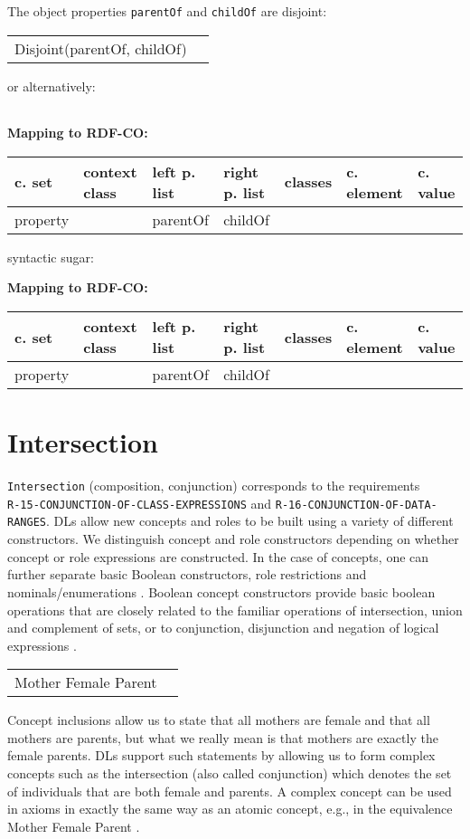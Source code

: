 \documentclass{llncs}
\newcommand{\ms}[1]{\texttt{#1}}
\newenvironment{gcotable}{
  \scriptsize
  \sffamily
  \vspace{0cm}
	\begin{center}
	\textbf{\vspace{0.4cm}Mapping to RDF-CO:} \\
  \begin{tabular}{l|l|l|l|l|l|l}
	\hline
  \textbf{c. set} & \textbf{context class} & \textbf{left p. list} & \textbf{right p. list} & \textbf{classes} & \textbf{c. element} & \textbf{c. value} \\
  \hline

}{
  \hline
  \end{tabular}
	\end{center}
}
\newenvironment{DL}{
\vspace{0cm}
	\begin{center}
  \begin{tabular}{r l}

}{
  \end{tabular}
	\end{center}
}
\begin{document}
The object properties \ms{parentOf} and \ms{childOf} are disjoint:

\begin{DL}
Disjoint(parentOf, childOf)\\
\end{DL}

or alternatively:

\begin{DL}

\end{DL}

\begin{gcotable}
property &  & parentOf & childOf &  &  \\
\end{gcotable}

syntactic sugar:

\begin{gcotable}
property &  & parentOf & childOf &  &  \\
\end{gcotable}

\section{Intersection}

\ms{Intersection} (composition, conjunction) corresponds to the requirements \\
\ms{R-15-CONJUNCTION-OF-CLASS-EXPRESSIONS} and \ms{R-16-CONJUNCTION-OF-DATA-} \ms{RANGES}.
DLs allow new concepts and roles to be
built using a variety of different constructors. We distinguish concept and role 
constructors depending on whether concept or role expressions are constructed. In the case of
concepts, one can further separate basic Boolean constructors, role restrictions and nominals/enumerations \cite{Kroetzsch2012}.
Boolean concept constructors provide basic boolean operations that are closely related to
the familiar operations of intersection, union and complement of sets, or to conjunction,
disjunction and negation of logical expressions \cite{Kroetzsch2012}.

\begin{DL}
Mother  Female  Parent
\end{DL}

Concept inclusions allow us to state that all mothers are female and that
all mothers are parents, but what we really mean is that mothers are exactly the female
parents. DLs support such statements by allowing us to form complex concepts such as
the intersection (also called conjunction)
which denotes the set of individuals that are both female and parents. A complex concept
can be used in axioms in exactly the same way as an atomic concept, e.g., in the
equivalence Mother  Female  Parent .
\end{document}
